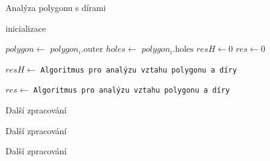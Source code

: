 \begin{algorithm}
    \caption{Analýza polygonu s dírami }
    \begin{algorithmic}[1]
        \STATE inicializace
        
            \STATE $polygon \gets$ $polygon_i.\text{outer}$
            \STATE $holes \gets$ $polygon_i.\text{holes}$
            \STATE $resH \gets 0$
            \STATE $res \gets 0$
            
                

                        \STATE $resH \gets$ \texttt{Algoritmus pro analýzu vztahu polygonu a díry}
                    \ENDFOR
                \ENDIF
                
                    \STATE $res \gets$ \texttt{Algoritmus pro analýzu vztahu polygonu a díry}
                    
                    \STATE Další zpracování
                    
                \ENDIF
                
                \STATE Další zpracování
            \ENDIF
        \ENDFOR
        
        \STATE Další zpracování
    \end{algorithmic}
\end{algorithm}